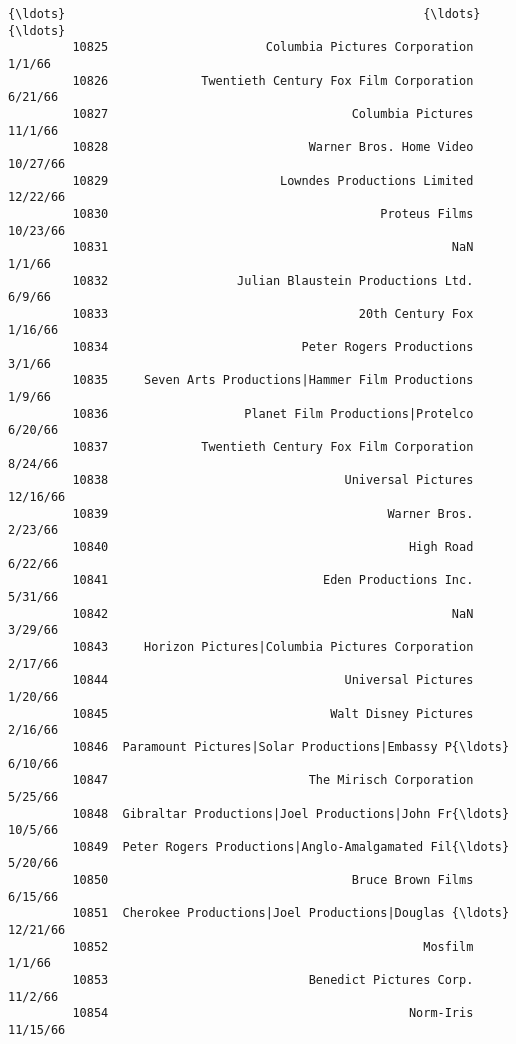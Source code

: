 \documentclass[11pt]{article}
\begin{document}
\begin{Verbatim}[commandchars=\\\{\}]
         {\ldots}                                                  {\ldots}          {\ldots}   
         10825                      Columbia Pictures Corporation       1/1/66   
         10826             Twentieth Century Fox Film Corporation      6/21/66   
         10827                                  Columbia Pictures      11/1/66   
         10828                            Warner Bros. Home Video     10/27/66   
         10829                        Lowndes Productions Limited     12/22/66   
         10830                                      Proteus Films     10/23/66   
         10831                                                NaN       1/1/66   
         10832                  Julian Blaustein Productions Ltd.       6/9/66   
         10833                                   20th Century Fox      1/16/66   
         10834                           Peter Rogers Productions       3/1/66   
         10835     Seven Arts Productions|Hammer Film Productions       1/9/66   
         10836                   Planet Film Productions|Protelco      6/20/66   
         10837             Twentieth Century Fox Film Corporation      8/24/66   
         10838                                 Universal Pictures     12/16/66   
         10839                                       Warner Bros.      2/23/66   
         10840                                          High Road      6/22/66   
         10841                              Eden Productions Inc.      5/31/66   
         10842                                                NaN      3/29/66   
         10843     Horizon Pictures|Columbia Pictures Corporation      2/17/66   
         10844                                 Universal Pictures      1/20/66   
         10845                               Walt Disney Pictures      2/16/66   
         10846  Paramount Pictures|Solar Productions|Embassy P{\ldots}      6/10/66   
         10847                            The Mirisch Corporation      5/25/66   
         10848  Gibraltar Productions|Joel Productions|John Fr{\ldots}      10/5/66   
         10849  Peter Rogers Productions|Anglo-Amalgamated Fil{\ldots}      5/20/66   
         10850                                  Bruce Brown Films      6/15/66   
         10851  Cherokee Productions|Joel Productions|Douglas {\ldots}     12/21/66   
         10852                                            Mosfilm       1/1/66   
         10853                            Benedict Pictures Corp.      11/2/66   
         10854                                          Norm-Iris     11/15/66   
         

\end{Verbatim}
\end{document}

